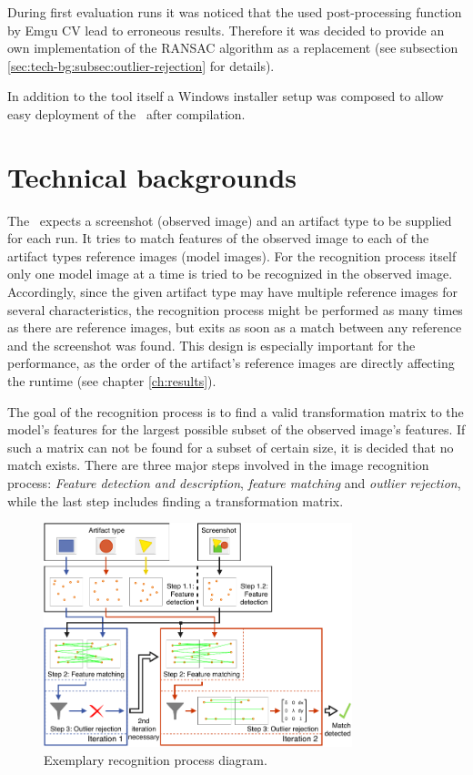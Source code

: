 During first evaluation runs it was noticed that the used post-processing function by Emgu CV lead to erroneous results. Therefore it was decided to provide an own implementation of the RANSAC algorithm as a replacement (see subsection \ref{sec:tech-bg:subsec:outlier-rejection} for details).

In addition to the tool itself a Windows installer setup was composed to allow easy deployment of the \vd~after compilation.

\section{Technical backgrounds}\label{sec:tech-bg}

The \vd~expects a screenshot (observed image) and an artifact type to be supplied for each run. It tries to match features of the observed image to each of the artifact types reference images (model images). For the recognition process itself only one model image at a time is tried to be recognized in the observed image. Accordingly, since the given artifact type may have multiple reference images for several characteristics, the recognition process might be performed as many times as there are reference images, but exits as soon as a match between any reference and the screenshot was found. This design is especially important for the performance, as the order of the artifact's reference images are directly affecting the runtime (see chapter \ref{ch:results}).

The goal of the recognition process is to find a valid transformation matrix to the model's features for the largest possible subset of the observed image's features. If such a matrix can not be found for a subset of certain size, it is decided that no match exists. There are three major steps involved in the image recognition process: \emph{Feature detection and description}, \emph{feature matching} and \emph{outlier rejection}, while the last step includes finding a transformation matrix.

\begin{figure}[h]
	\centering
	\includegraphics[width=0.8\textwidth]{fig/rec-process}
	\caption{Exemplary recognition process diagram.}\label{fig:recognition-process}
\end{figure}

